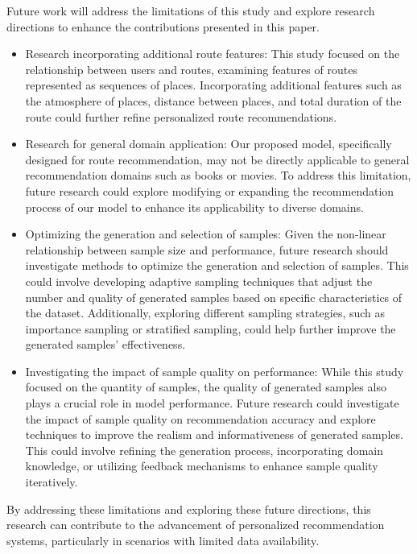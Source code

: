 \documentclass[]{article}
\begin{document}
Future work will address the limitations of this study and explore research directions to enhance the contributions presented in this paper.
\begin{itemize}
	\item Research incorporating additional route features: This study focused on the relationship between users and routes, examining features of routes represented as sequences of places. Incorporating additional features such as the atmosphere of places, distance between places, and total duration of the route could further refine personalized route recommendations.
	
	\item Research for general domain application: Our proposed model, specifically designed for route recommendation, may not be directly applicable to general recommendation domains such as books or movies. To address this limitation, future research could explore modifying or expanding the recommendation process of our model to enhance its applicability to diverse domains.
	
	\item Optimizing the generation and selection of samples: Given the non-linear relationship between sample size and performance, future research should investigate methods to optimize the generation and selection of samples. This could involve developing adaptive sampling techniques that adjust the number and quality of generated samples based on specific characteristics of the dataset. Additionally, exploring different sampling strategies, such as importance sampling or stratified sampling, could help further improve the generated samples' effectiveness.

	\item Investigating the impact of sample quality on performance: While this study focused on the quantity of samples, the quality of generated samples also plays a crucial role in model performance. Future research could investigate the impact of sample quality on recommendation accuracy and explore techniques to improve the realism and informativeness of generated samples. This could involve refining the generation process, incorporating domain knowledge, or utilizing feedback mechanisms to enhance sample quality iteratively.
\end{itemize}

By addressing these limitations and exploring these future directions, this research can contribute to the advancement of personalized recommendation systems, particularly in scenarios with limited data availability.




 

\end{document}
